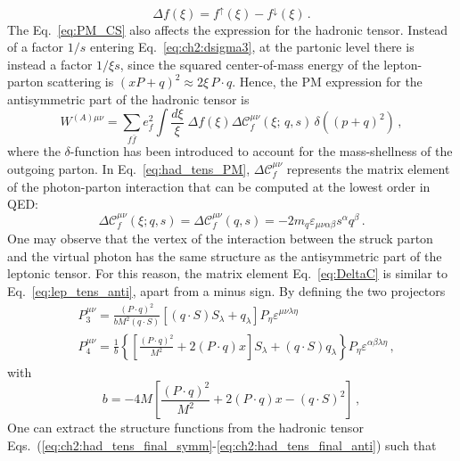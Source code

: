 \begin{equation}
  \Delta f (\xi) = f^{\uparrow}(\xi) - f^{\downarrow}(\xi) \,.
\end{equation}
The Eq.~\eqref{eq:PM_CS} also affects the expression for the hadronic tensor. Instead of a factor $1/s$ entering Eq.~\eqref{eq:ch2:dsigma3}, at the partonic level there is instead a factor $1/\xi s$, since the squared center-of-mass energy of the lepton-parton scattering is $(xP + q)^2 \approx 2 \xi \, P \cdot q$. Hence, the PM expression for the antisymmetric part of the hadronic tensor is
\begin{equation}
  W^{(A) \mu \nu}= \sum_{f\bar{f}} e_f^2\int \frac{d \xi}{\xi} \; \Delta f (\xi) \Delta \mathcal{C}^{\mu \nu}_{f} (\xi; \,q,s) \, \delta((p + q)^2) \,,
  \label{eq:had_tens_PM}
\end{equation}
where the $\delta$-function has been introduced to account for the mass-shellness of the outgoing parton. In Eq.~\eqref{eq:had_tens_PM}, $\Delta \mathcal{C}^{\mu \nu}_{f}$ represents the matrix element of the photon-parton interaction that can be computed at the lowest order in QED:
\begin{equation}
  \Delta \mathcal{C}_f^{\mu \nu} (\xi; q,s) = \Delta \mathcal{C}_f^{\mu \nu} (q,s)  = - 2 m_q \varepsilon_{\mu \nu \alpha \beta} s^{\alpha} q^{\beta}\,.
  \label{eq:DeltaC}
\end{equation}
One may observe that the vertex of the interaction between the struck parton and the virtual photon has the same structure as the antisymmetric part of the leptonic tensor. For this reason, the matrix element Eq.~\eqref{eq:DeltaC} is similar to Eq.~\eqref{eq:lep_tens_anti}, apart from a minus sign. By defining the two projectors
\begin{align}
  & P_3^{\mu \nu} = \frac{(P \cdot q)^2}{b M^2 (q \cdot S)} \left[ (q \cdot S) S_{\lambda} + q_{\lambda}  \right] P_{\eta} \varepsilon^{\mu \nu \lambda \eta} 
  \\
  & P_4^{\mu \nu} = \frac{1}{b} \left\{ \left[ \frac{(P\cdot q)^2}{M^2} + 2 (P \cdot q) x \right]S_{\lambda} + (q \cdot S)q_{\lambda} \right\} P_{\eta} \varepsilon^{\alpha \beta \lambda \eta}\,,
\end{align}
with 
\begin{equation}
  b = -4M \left[ \frac{(P\cdot q)^2}{M^2}  + 2 (P \cdot q) x - (q \cdot S)^2\right]\,,
\end{equation}
One can extract the structure functions from the hadronic tensor Eqs.~(\ref{eq:ch2:had_tens_final_symm}-\ref{eq:ch2:had_tens_final_anti}) such that
